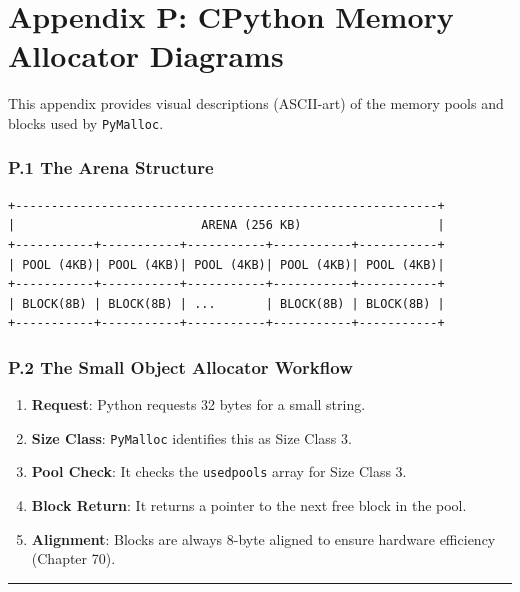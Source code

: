 \hypertarget{appendix-p-cpython-memory-allocator-diagrams}{%
\chapter{Appendix P: CPython Memory Allocator
Diagrams}\label{appendix-p-cpython-memory-allocator-diagrams}}

This appendix provides visual descriptions (ASCII-art) of the memory
pools and blocks used by \passthrough{\lstinline!PyMalloc!}.

\hypertarget{p.1-the-arena-structure}{%
\subsection{P.1 The Arena Structure}\label{p.1-the-arena-structure}}

\begin{lstlisting}
+-----------------------------------------------------------+
|                          ARENA (256 KB)                   |
+-----------+-----------+-----------+-----------+-----------+
| POOL (4KB)| POOL (4KB)| POOL (4KB)| POOL (4KB)| POOL (4KB)|
+-----------+-----------+-----------+-----------+-----------+
| BLOCK(8B) | BLOCK(8B) | ...       | BLOCK(8B) | BLOCK(8B) |
+-----------+-----------+-----------+-----------+-----------+
\end{lstlisting}

\hypertarget{p.2-the-small-object-allocator-workflow}{%
\subsection{P.2 The Small Object Allocator
Workflow}\label{p.2-the-small-object-allocator-workflow}}

\begin{enumerate}
\def\labelenumi{\arabic{enumi}.}
\tightlist
\item
  \textbf{Request}: Python requests 32 bytes for a small string.
\item
  \textbf{Size Class}: \passthrough{\lstinline!PyMalloc!} identifies
  this as Size Class 3.
\item
  \textbf{Pool Check}: It checks the \passthrough{\lstinline!usedpools!}
  array for Size Class 3.
\item
  \textbf{Block Return}: It returns a pointer to the next free block in
  the pool.
\item
  \textbf{Alignment}: Blocks are always 8-byte aligned to ensure
  hardware efficiency (Chapter 70).
\end{enumerate}

\begin{center}\rule{0.5\linewidth}{0.5pt}\end{center}
